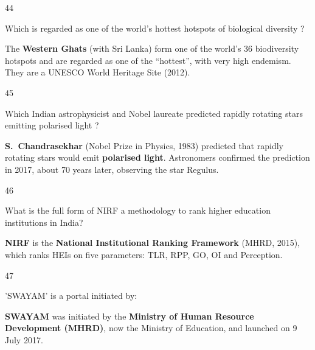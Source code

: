 \begin{question}{44}
{Which is regarded as one of the world's hottest hotspots of biological diversity ?\par}
\begin{explain}
The \textbf{Western Ghats} (with Sri Lanka) form one of the world's 36 biodiversity hotspots and are regarded as one of the ``hottest'', with very high endemism. They are a UNESCO World Heritage Site (2012).
\end{explain}
\end{question}

\begin{question}{45}
{Which Indian astrophysicist and Nobel laureate predicted rapidly rotating stars emitting polarised light ?\par}
\begin{explain}
\textbf{S.~Chandrasekhar} (Nobel Prize in Physics, 1983) predicted that rapidly rotating stars would emit \textbf{polarised light}. Astronomers confirmed the prediction in 2017, about 70 years later, observing the star Regulus.
\end{explain}
\end{question}

\begin{question}{46}
{What is the full form of NIRF a methodology to rank higher education institutions in India?\par}
\begin{explain}
\textbf{NIRF} is the \textbf{National Institutional Ranking Framework} (MHRD, 2015), which ranks HEIs on five parameters: TLR, RPP, GO, OI and Perception.
\end{explain}
\end{question}

\begin{question}{47}
{'SWAYAM' is a portal initiated by:\par}
\begin{explain}
\textbf{SWAYAM} was initiated by the \textbf{Ministry of Human Resource Development (MHRD)}, now the Ministry of Education, and launched on 9 July 2017.
\end{explain}
\end{question}

